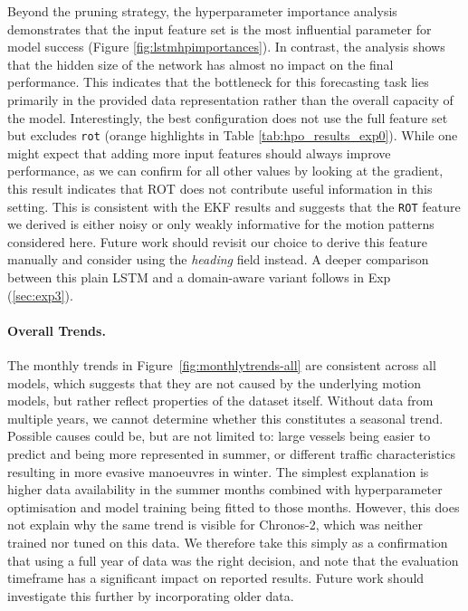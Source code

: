Beyond the pruning strategy, the hyperparameter importance analysis demonstrates that the input feature set is the most influential parameter for model success (Figure \ref{fig:lstmhpimportances}).
In contrast, the analysis shows that the hidden size of the network has almost no impact on the final performance.
This indicates that the bottleneck for this forecasting task lies primarily in the provided data representation rather than the overall capacity of the model.
Interestingly, the best configuration does not use the full feature set but excludes \texttt{rot} (orange highlights in Table \ref{tab:hpo_results_exp0}).
While one might expect that adding more input features should always improve performance, as we can confirm for all other values by looking at the gradient, this result indicates that \ac{ROT} does not contribute useful information in this setting.
This is consistent with the \ac{EKF} results and suggests that the \texttt{\ac{ROT}} feature we derived is either noisy or only weakly informative for the motion patterns considered here.
Future work should revisit our choice to derive this feature manually and consider using the \textit{heading} field instead.
A deeper comparison between this plain \ac{LSTM} and a domain-aware variant follows in Exp~ (\ref{sec:exp3}).




\paragraph{Overall Trends.}
The monthly trends in Figure~\ref{fig:monthlytrends-all} are consistent across all models, which suggests that they are not caused by the underlying motion models, but rather reflect properties of the dataset itself.
Without data from multiple years, we cannot determine whether this constitutes a seasonal trend. Possible causes could be, but are not limited to: large vessels being easier to predict and being more represented in summer, or different traffic characteristics resulting in more evasive manoeuvres in winter.
The simplest explanation is higher data availability in the summer months combined with hyperparameter optimisation and model training being fitted to those months.
However, this does not explain why the same trend is visible for Chronos-2, which was neither trained nor tuned on this data.
We therefore take this simply as a confirmation that using a full year of data was the right decision, and note that the evaluation timeframe has a significant impact on reported results. Future work should investigate this further by incorporating older data.

